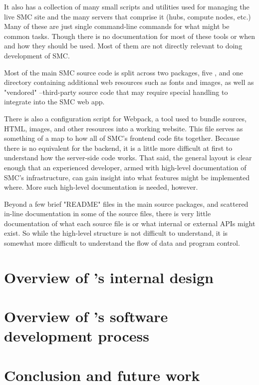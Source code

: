 \documentclass{deliverablereport}
\begin{document}
It also has a collection of many small scripts and utilities used for managing
the live SMC site and the many servers that comprise it (hubs, compute nodes,
etc.)  Many of these are just single command-line commands for what might be
common tasks.  Though there is no documentation for most of these tools or when
and how they should be used.  Most of them are not directly relevant to
doing development of SMC.

Most of the main SMC source code is split across two \Python packages, five
\JavaScript, and one directory containing additional web resources such as
fonts and images, as well as "vendored" \JavaScript--third-party source code
that may require special handling to integrate into the SMC web app.

There is also a configuration script for Webpack,
a tool used to bundle \JavaScript sources, HTML, images, and other resources
into a working website.  This file serves as something of a map to how all of
SMC's frontend code fits together.  Because there is no equivalent for the
backend, it is a little more difficult at first to understand how the
server-side code works.  That said, the general layout is clear enough that an
experienced developer, armed with high-level documentation of SMC's
infrastructure, can gain insight into what features might be implemented where.
More such high-level documentation is needed, however.

Beyond a few brief "README" files in the main source packages, and scattered
in-line documentation in some of the source files, there is very little
documentation of what each source file is or what internal or external APIs
might exist.  So while the high-level structure is not difficult to understand,
it is somewhat more difficult to understand the flow of data and program
control.

\section{Overview of \SMC's internal design}


\section{Overview of \SMC's software development process}

\section{Conclusion and future work}


\printbibliography
\end{document}

